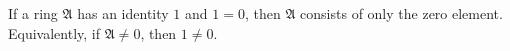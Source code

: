 If a ring $\mathfrak{A}$ has an identity $1$ and $1 = 0$, then $\mathfrak{A}$ consists of only the zero element. Equivalently, if $\mathfrak{A} \neq 0$, then $1 \neq 0$.
